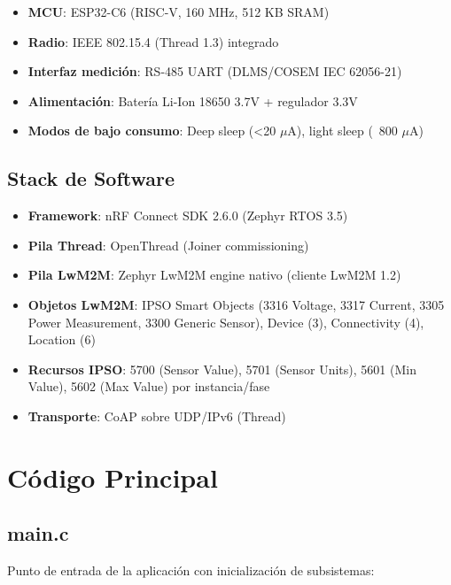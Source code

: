 \begin{itemize}
    \item \textbf{MCU}: ESP32-C6 (RISC-V, 160 MHz, 512 KB SRAM)
    \item \textbf{Radio}: IEEE 802.15.4 (Thread 1.3) integrado
    \item \textbf{Interfaz medición}: RS-485 UART (DLMS/COSEM IEC 62056-21)
    \item \textbf{Alimentación}: Batería Li-Ion 18650 3.7V + regulador 3.3V
    \item \textbf{Modos de bajo consumo}: Deep sleep (<20 $\mu$A), light sleep (~800 $\mu$A)
\end{itemize}

\subsection{Stack de Software}

\begin{itemize}
    \item \textbf{Framework}: nRF Connect SDK 2.6.0 (Zephyr RTOS 3.5)
    \item \textbf{Pila Thread}: OpenThread (Joiner commissioning)
    \item \textbf{Pila LwM2M}: Zephyr LwM2M engine nativo (cliente LwM2M 1.2)
    \item \textbf{Objetos LwM2M}: IPSO Smart Objects (3316 Voltage, 3317 Current, 3305 Power Measurement, 3300 Generic Sensor), Device (3), Connectivity (4), Location (6)
    \item \textbf{Recursos IPSO}: 5700 (Sensor Value), 5701 (Sensor Units), 5601 (Min Value), 5602 (Max Value) por instancia/fase
    \item \textbf{Transporte}: CoAP sobre UDP/IPv6 (Thread)
\end{itemize}

\section{Código Principal}

\subsection{main.c}

Punto de entrada de la aplicación con inicialización de subsistemas:

